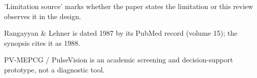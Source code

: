 \begin{table}[htbp]
  \par\footnotesize 'Limitation source' marks whether the paper states the limitation or this review observes it in the design.
  \par\footnotesize Rangayyan \& Lehner is dated 1987 by its PubMed record (volume 15); the synopsis cites it as 1988.
  \par\footnotesize PV-MEPCG / PulseVision is an academic screening and decision-support prototype, not a diagnostic tool.
\end{table}
